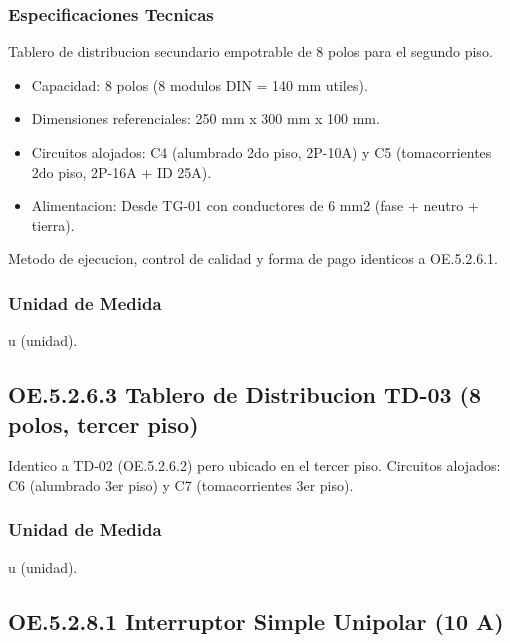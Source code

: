 \subsubsection{Especificaciones Tecnicas}

Tablero de distribucion secundario empotrable de 8 polos para el segundo piso.

\begin{itemize}[nosep]
  \item Capacidad: 8 polos (8 modulos DIN = 140 mm utiles).
  \item Dimensiones referenciales: 250 mm x 300 mm x 100 mm.
  \item Circuitos alojados: C4 (alumbrado 2do piso, 2P-10A) y C5 (tomacorrientes 2do piso, 2P-16A + ID 25A).
  \item Alimentacion: Desde TG-01 con conductores de 6 mm2 (fase + neutro + tierra).
\end{itemize}

Metodo de ejecucion, control de calidad y forma de pago identicos a OE.5.2.6.1.

\subsubsection{Unidad de Medida}

u (unidad).

\subsection{OE.5.2.6.3 Tablero de Distribucion TD-03 (8 polos, tercer piso)}

Identico a TD-02 (OE.5.2.6.2) pero ubicado en el tercer piso. Circuitos alojados: C6 (alumbrado 3er piso) y C7 (tomacorrientes 3er piso).

\subsubsection{Unidad de Medida}

u (unidad).

\subsection{OE.5.2.8.1 Interruptor Simple Unipolar (10 A)}

